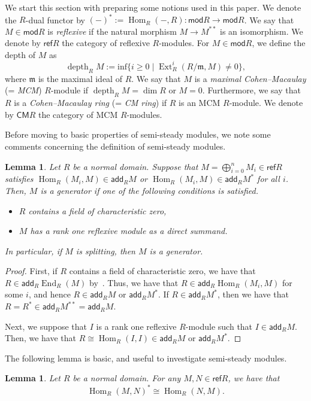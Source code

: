 \documentclass[11pt]{amsart}
\newtheorem{lemm}[theo]{Lemma}
\theoremstyle{definition}
\newcommand{\fkm}{\mathfrak{m}}
\DeclareMathOperator{\depth}{depth}
\DeclareMathOperator{\Ext}{Ext}
\DeclareMathOperator{\Hom}{Hom}
\DeclareMathOperator{\End}{End}
\newcommand{\add}{\mathsf{add}}
\newcommand{\CM}{\mathsf{CM}}
\newcommand{\mc}{\mathsf{mod}}
\newcommand{\refl}{\mathsf{ref}}
\begin{document}
We start this section with preparing some notions used in this paper. We denote the $R$-dual functor by $(-)^*:=\Hom_R(-, R) : \mc R\rightarrow \mc R$. We say that $M\in \mc R$ is \emph{reflexive} if the natural morphism $M\rightarrow M^{**}$ is an isomorphism. We denote by $\refl R$ the category of reflexive $R$-modules. For $M\in\mc R$, we define the depth of $M$ as
\[
\depth_RM:=\mathrm{inf} \{ i\ge0 \mid \Ext^i_R(R/\fkm, M)\neq 0\},
\]
where $\fkm$ is the maximal ideal of $R$. We say that $M$ is a \emph{maximal Cohen--Macaulay} (= \emph{MCM}) $R$-module if $\depth_RM=\dim R$ or $M=0$. Furthermore, we say that $R$ is a \emph{Cohen--Macaulay ring} (= \emph{CM ring}) if $R$ is an MCM $R$-module. We denote by $\CM R$ the category of MCM $R$-modules.


Before moving to basic properties of semi-steady modules, we note some comments concerning the definition of semi-steady modules.

\goodbreak
\begin{lemm}\label{prop_semisteady}
Let $R$ be a normal domain. Suppose that $M=\bigoplus_{i=0}^nM_i\in\refl R$ satisfies $\Hom_R(M_i,M)\in\add_RM$ or $\Hom_R(M_i,M)\in\add_RM^*$ for all $i$. Then, $M$ is a generator if one of the following conditions is satisfied.
\begin{itemize}%
\item $R$ contains a field of characteristic zero,
\item $M$ has a rank one reflexive module as a direct summand.
\end{itemize}
In particular, if $M$ is splitting, then $M$ is a generator.
\end{lemm}

\begin{proof}
First, if $R$ contains a field of characteristic zero, we have that $R\in\add_R\End_R(M)$ by~\cite[5.6]{Aus3}. Thus, we have that $R\in\add_R\Hom_R(M_i,M)$ for some $i$, and hence $R\in\add_RM$ or $\add_RM^*$. If $R\in\add_RM^*$, then we have that $R=R^*\in\add_RM^{**}=\add_RM$.

Next, we suppose that $I$ is a rank one reflexive $R$-module such that $I\in\add_R M$. Then, we have that $R\cong\Hom_R(I, I)\in\add_RM$ or $\add_RM^*$.
\end{proof}

The following lemma is basic, and useful to investigate semi-steady modules.

\begin{lemm}\label{basic_lem_ref}
Let $R$ be a normal domain. For any $M, N\in\refl R$, we have that
\[
\Hom_R(M,N)^*\cong\Hom_R(N,M).
\]
\end{lemm}
\end{document}
